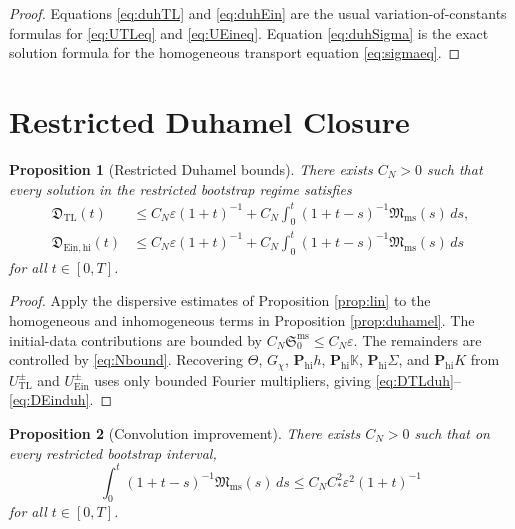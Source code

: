 \documentclass[11pt]{article}
\newtheorem{proposition}{Proposition}
\begin{document}
\begin{proof}
Equations \eqref{eq:duhTL} and \eqref{eq:duhEin} are the usual variation-of-constants formulas for \eqref{eq:UTLeq} and \eqref{eq:UEineq}. Equation \eqref{eq:duhSigma} is the exact solution formula for the homogeneous transport equation \eqref{eq:sigmaeq}.
\end{proof}

\section{Restricted Duhamel Closure}

\begin{proposition}[Restricted Duhamel bounds]
\label{prop:close}
There exists \(C_N>0\) such that every solution in the restricted bootstrap regime satisfies
\begin{align}
\mathfrak D_{\mathrm{TL}}(t)
&\le
C_N\varepsilon(1+t)^{-1}
+ C_N\int_0^t (1+t-s)^{-1}\mathfrak M_{\mathrm{ms}}(s)\,ds,
\label{eq:DTLduh}
\\
\mathfrak D_{\mathrm{Ein,hi}}(t)
&\le
C_N\varepsilon(1+t)^{-1}
+ C_N\int_0^t (1+t-s)^{-1}\mathfrak M_{\mathrm{ms}}(s)\,ds
\label{eq:DEinduh}
\end{align}
for all \(t\in[0,T]\).
\end{proposition}

\begin{proof}
Apply the dispersive estimates of Proposition \ref{prop:lin} to the homogeneous and inhomogeneous terms in Proposition \ref{prop:duhamel}. The initial-data contributions are bounded by \(C_N\mathfrak S_0^{\mathrm{ms}}\le C_N\varepsilon\). The remainders are controlled by \eqref{eq:Nbound}. Recovering \(\Theta\), \(G_\chi\), \(\mathbf P_{\mathrm{hi}}h\), \(\mathbf P_{\mathrm{hi}}\mathbb K\), \(\mathbf P_{\mathrm{hi}}\Sigma\), and \(\mathbf P_{\mathrm{hi}}K\) from \(U_{\mathrm{TL}}^\pm\) and \(U_{\mathrm{Ein}}^\pm\) uses only bounded Fourier multipliers, giving \eqref{eq:DTLduh}--\eqref{eq:DEinduh}.
\end{proof}

\begin{proposition}[Convolution improvement]
\label{prop:conv}
There exists \(C_N>0\) such that on every restricted bootstrap interval,
\begin{equation}
\int_0^t (1+t-s)^{-1}\mathfrak M_{\mathrm{ms}}(s)\,ds
\le
C_NC_\ast^2\varepsilon^2(1+t)^{-1}
\label{eq:waveconv}
\end{equation}
for all \(t\in[0,T]\).
\end{proposition}
\end{document}
